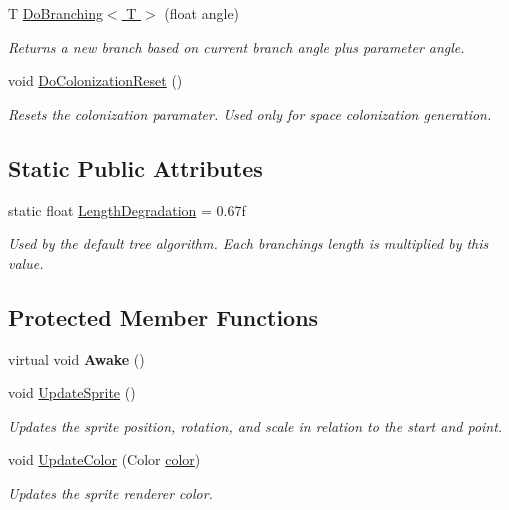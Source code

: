 \begin{DoxyCompactItemize}
T \hyperlink{class_fractal_tree_1_1_stationary_branch_a57ff42d0c4793c0c40aa1671905bf222}{Do\+Branching$<$ T $>$} (float angle)
\begin{DoxyCompactList}\small\item\em Returns a new branch based on current branch angle plus parameter angle. \end{DoxyCompactList}\item 
void \hyperlink{class_fractal_tree_1_1_stationary_branch_a57a5b1cbc9fd081c5b8cb41b61d24502}{Do\+Colonization\+Reset} ()
\begin{DoxyCompactList}\small\item\em Resets the colonization paramater. Used only for space colonization generation. \end{DoxyCompactList}\end{DoxyCompactItemize}
\subsection*{Static Public Attributes}
\begin{DoxyCompactItemize}
\item 
static float \hyperlink{class_fractal_tree_1_1_stationary_branch_a406e104be242fe61b1c1c1ea7d67f167}{Length\+Degradation} = 0.\+67f
\begin{DoxyCompactList}\small\item\em Used by the default tree algorithm. Each branchings length is multiplied by this value. \end{DoxyCompactList}\end{DoxyCompactItemize}
\subsection*{Protected Member Functions}
\begin{DoxyCompactItemize}
\item 
\mbox{\label{class_fractal_tree_1_1_stationary_branch_a295c6b57b1040dac71a8195a6759ec92}} 
virtual void {\bfseries Awake} ()
\item 
void \hyperlink{class_fractal_tree_1_1_stationary_branch_a79b077e778c1d8aa92f3f4ad9a516058}{Update\+Sprite} ()
\begin{DoxyCompactList}\small\item\em Updates the sprite position, rotation, and scale in relation to the start and point. \end{DoxyCompactList}\item 
void \hyperlink{class_fractal_tree_1_1_stationary_branch_ae80389d3859645e0023dd11533b06e83}{Update\+Color} (Color \hyperlink{class_fractal_tree_1_1_stationary_branch_a265ca67d50299986adb192386fc7b932}{color})
\begin{DoxyCompactList}\small\item\em Updates the sprite renderer color. \end{DoxyCompactList}\end{DoxyCompactItemize}

